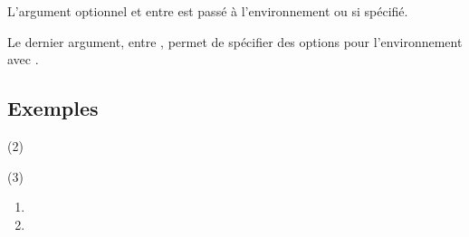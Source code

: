 \documentclass[french,11pt,a4paper]{article}
\begin{document}
L'argument optionnel et entre  est passé à l'environnement  ou  si spécifié.

Le dernier argument, entre , permet de spécifier des options pour l'environnement  avec .

\subsection{Exemples}

\begin{DemoCode}{}
\lipsum[1][1-2]

\begin{MultiCols}(2)
    \lipsum[2]
\end{MultiCols}

\lipsum[1][3-4]
\end{DemoCode}

\begin{DemoCode}{}
\lipsum[1][1-2]

\begin{MultiCols}[CoeffEspVert=0.25,EpTrait=1pt](3)
    \lipsum[2]
\end{MultiCols}

\lipsum[1][3-4]
\end{DemoCode}

\begin{DemoCode}{}
\begin{enumerate}
    \item \lipsum[1][1-2]
    \item \lipsum[1][3-4]
\end{enumerate}

\lipsum[3][1]
\end{DemoCode}
\end{document}
